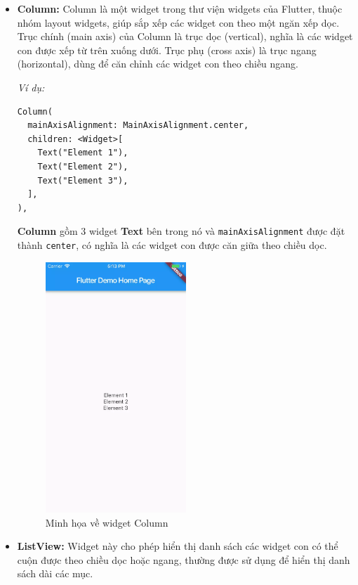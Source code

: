 \documentclass[../DoAn.tex]{subfiles}
\numberwithin{figure}{chapter}
\begin{document}
\begin{itemize}
\item \textbf{Column:} Column là một widget trong thư viện widgets của Flutter, thuộc nhóm layout widgets, giúp sắp xếp các widget con theo một ngăn xếp dọc. Trục chính (main axis) của Column là trục dọc (vertical), nghĩa là các widget con được xếp từ trên xuống dưới. Trục phụ (cross axis) là trục ngang (horizontal), dùng để căn chỉnh các widget con theo chiều ngang.

\textit{Ví dụ:}
\begin{lstlisting}
Column(
  mainAxisAlignment: MainAxisAlignment.center,
  children: <Widget>[
    Text("Element 1"),
    Text("Element 2"),
    Text("Element 3"),
  ],
),
\end{lstlisting}

\textbf{{Column}} gồm 3 widget \textbf{Text} bên trong nó và \texttt{mainAxisAlignment} được đặt thành \texttt{center}, có nghĩa là các widget con được căn giữa theo chiều dọc.
\begin{figure}[H]
    \centering
    \includegraphics[width=0.5\textwidth]{Hinhve/Chuong5/columnWidget.png}
    \caption{Minh họa về widget Column}
    \label{fig:columnwidget}
\end{figure}

\item \textbf{ListView:} Widget này cho phép hiển thị danh sách các widget con có thể cuộn được theo chiều dọc hoặc ngang, thường được sử dụng để hiển thị danh sách dài các mục.


\end{itemize}
\end{document}
